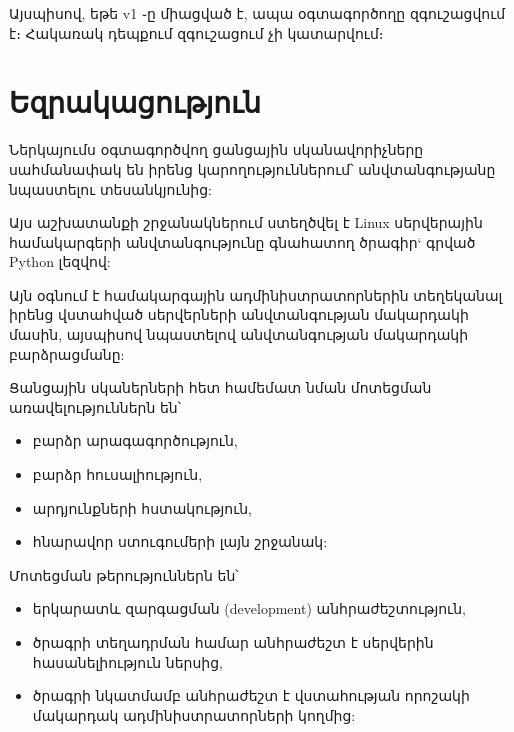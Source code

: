 \documentclass[a4paper,12pt]{article}
\begin{document}
\begin{sloppypar}
Այսպիսով, եթե v1 ֊ը միացված է, ապա օգտագործողը զգուշացվում է։
Հակառակ դեպքում զգուշացում չի կատարվում։


\newpage
\section{Եզրակացություն}


Ներկայումս օգտագործվող ցանցային սկանավորիչները սահմանափակ են
իրենց կարողություններում՝ անվտանգությանը նպաստելու
տեսանկյունից:

Այս աշխատանքի շրջանակներում ստեղծվել է Linux սերվերային
համակարգերի անվտանգությունը գնահատող
ծրագիր` գրված Python լեզվով:

Այն օգնում է համակարգային ադմինիստրատորներին տեղեկանալ
իրենց վստահված սերվերների անվտանգության մակարդակի մասին,
այսպիսով նպաստելով անվտանգության մակարդակի բարձրացմանը:

Ցանցային սկաներների հետ համեմատ նման մոտեցման
առավելություններն են՝

\begin{itemize}
\item բարձր արագագործություն,
\item բարձր հուսալիություն,
\item արդյունքների հստակություն,
\item հնարավոր ստուգումերի լայն շրջանակ:
\end{itemize}

Մոտեցման թերություններն են՝

\begin{itemize}
\item երկարատև զարգացման (development) անհրաժեշտություն,
\item ծրագրի տեղադրման համար անհրաժեշտ է սերվերին հասանելիություն ներսից,
\item ծրագրի նկատմամբ անհրաժեշտ է վստահության որոշակի
	մակարդակ ադմինիստրատորների կողմից:
\end{itemize}


\newpage

\end{sloppypar}
\end{document}
